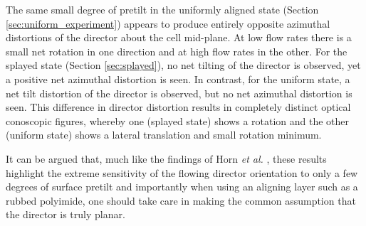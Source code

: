 The same small degree of pretilt in the uniformly aligned state (Section \ref{sec:uniform_experiment}) appears to produce entirely opposite azimuthal distortions of the director about the cell mid-plane. At low flow rates there is a small net rotation in one direction and at high flow rates in the other. For the splayed state (Section \ref{sec:splayed}), no net tilting of the director is observed, yet a positive net azimuthal distortion is seen. In contrast, for the uniform state, a net tilt distortion of the director is observed, but no net azimuthal distortion is seen. This difference in director distortion results in completely distinct optical conoscopic figures, whereby one (splayed state) shows a rotation and the other (uniform state) shows a lateral translation and small rotation minimum.

It can be argued that, much like the findings of Horn \textit{et al.} \cite{Horn2003}, these results highlight the extreme sensitivity of the flowing director orientation to only a few degrees of surface pretilt and importantly when using an aligning layer such as a rubbed polyimide, one should take care in making the common assumption that the director is truly planar.
